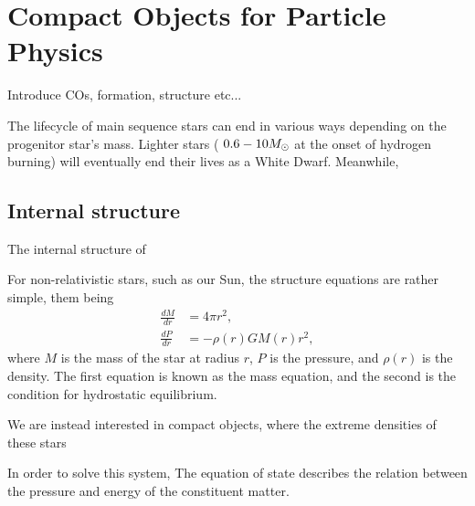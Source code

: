 \graphicspath{{img/chapter_2/}}



\chapter{Compact Objects for Particle Physics}
\label{chapter:compactobjects}

\begin{synopsis}
  Introduce COs, formation, structure etc...  
\end{synopsis}

  

  The lifecycle of main sequence stars can end in various ways
  depending on the progenitor star's mass. Lighter stars ($~0.6 - 10 M_\odot$ at  
  the onset of hydrogen burning) will eventually end their lives as a 
  White Dwarf. Meanwhile, 

  

  \section{Internal structure}

  The internal structure of 

  For non-relativistic stars, such as our Sun, the structure equations are
  rather simple, them being
  \begin{align}
    \frac{d M}{dr}  &= 4 \pi r^2,\\
    \frac{d P }{dr} &= -\rho(r) G M(r) r^2,
  \end{align}
  where $M$ is the mass of the star at radius $r$, $P$ is the pressure,
  and $\rho(r)$ is the density.
  The first equation is known as the mass equation, and the second is the
  condition for hydrostatic equilibrium. 

  We are instead interested in compact objects, where the extreme densities 
  of these stars 

  In order to solve this system, 
  The equation of state describes the relation between the pressure 
  and energy of the constituent matter.


